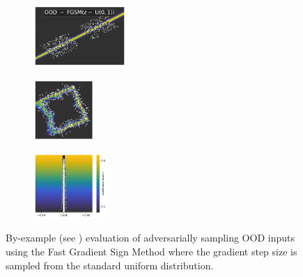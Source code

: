 \begin{figure}[H]
    \centering
    \begin{subfigure}
        \centering
        \includegraphics[width=0.388\textwidth,valign=t]{ood-detection/figures/ood-synthesis/ood-line-uniform-fgsm.pdf}
    \end{subfigure}
    \begin{subfigure}
        \centering
        \includegraphics[width=0.254\textwidth,valign=t]{ood-detection/figures/ood-synthesis/ood-circle-uniform-fgsm.pdf}
    \end{subfigure}
    \begin{subfigure}
        \centering
        \includegraphics[width=0.308\textwidth,valign=t]{ood-detection/figures/ood-synthesis/ood-haystack-uniform-fgsm.pdf}
    \end{subfigure}

    \caption[Adversarially Uniform Synthetic OOD Samples]{By-example (see ) evaluation of adversarially sampling OOD inputs using the Fast Gradient Sign Method \cite{fast-gradient-2014} where the gradient step size is sampled from the standard uniform distribution.}
    \label{fig:fgsm-uniform-ood-samples}
\end{figure}

